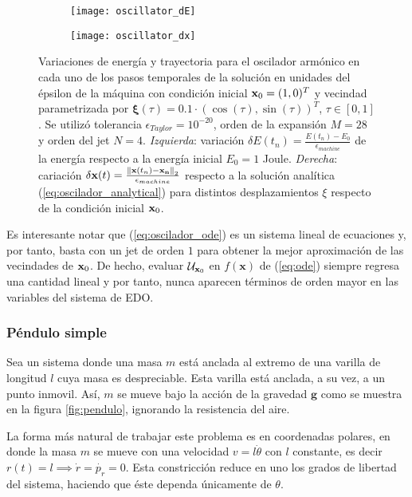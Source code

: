  \begin{figure}[h!]
\centering
\begin{subfigure}{0.49\textwidth}
	\centering
	\texttt{[image: oscillator\_dE]}
	\label{fig:oscillator_dE}
\end{subfigure}
%
\begin{subfigure}{0.49\textwidth}
	\centering
	\texttt{[image: oscillator\_dx]}
	\caption{}
	\label{fig:oscillator_dx}
\end{subfigure}
\caption{Variaciones de energía y trayectoria para el oscilador armónico en cada uno de los pasos temporales de la solución en unidades del épsilon de la máquina con condición inicial $\mathbf{x}_0 = (1,0)^T$ y vecindad parametrizada por  $\mathbf{\xi}(\tau) = 0.1\cdot \left( \cos(\tau), \sin(\tau) \right)^T$, $\tau \in [0,1]$. Se utilizó tolerancia $\epsilon_{Taylor} = 10^{-20}$, orden de la expansión $M = 28$ y orden del jet $N=4$. \textit{Izquierda}: variación $\delta E(t_n) = \frac{E(t_n)-E_0}{\epsilon_{machine}}$ de la energía respecto a la energía inicial $E_0 = 1$ Joule. \textit{Derecha}: cariación $\delta \mathbf{x}(t) =  \frac{\left\lVert\mathbf{x}(t_n) - \mathbf{x_n}\right\rVert_2}{\epsilon_{machine}}$ respecto a la solución analítica (\ref{eq:oscilador_analytical}) para distintos desplazamientos $\xi$ respecto de la condición inicial $\mathbf{x}_0$.}
\label{fig:oscillator_deltas}
\end{figure}

Es interesante notar que (\ref{eq:oscilador_ode}) es un sistema lineal de ecuaciones y, por tanto, basta con un jet de orden $1$ para obtener la mejor aproximación de las vecindades de $\mathbf{x}_0$. De hecho, evaluar $\mathcal{U}_{\mathbf{x}_0}$ en $f(\mathbf{x})$ de (\ref{eq:ode}) siempre regresa una cantidad lineal y por tanto, nunca aparecen términos de orden mayor en las variables del sistema de EDO.

\subsubsection{Péndulo simple}
\label{sec:pendulo}
Sea un sistema donde una masa $m$ está anclada al extremo de una varilla de longitud $l$ cuya masa es despreciable. Esta varilla está anclada, a su vez, a un punto inmovil. Así, $m$ se mueve bajo la acción de la gravedad $\mathbf{g}$ como se muestra en la figura \ref{fig:pendulo}, ignorando la resistencia del aire.



La forma más natural de trabajar este problema es en coordenadas polares, en donde la masa $m$ se mueve con una velocidad $v = l\dot{\theta}$ con $l$ constante, es decir $r(t) = l \implies \dot{r} = \dot{p_r} = 0$. Esta constricción reduce en uno los grados de libertad del sistema, haciendo que éste dependa únicamente de $\theta$. 

